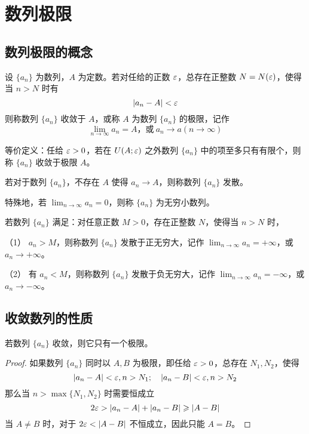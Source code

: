 \chapter{数列极限}

\section{数列极限的概念}

\begin{definition}
	设 $\{a_n\}$ 为数列，$A$ 为定数。若对任给的正数 $\varepsilon$，总存在正整数 $N=N(\varepsilon)$，使得当 $n>N$ 时有
	$$|a_n - A| < \varepsilon$$
	则称数列 $\{a_n\}$ 收敛于 $A$，或称 $A$ 为数列 $\{a_n\}$ 的极限，记作
	$$\displaystyle\lim_{n\to \infty} a_n = A \text{，或}\ a_n \to a(n \to \infty)$$
\end{definition}

等价定义：任给 $\varepsilon > 0$，若在 $U(A;\varepsilon)$ 之外数列 $\{a_n\}$ 中的项至多只有有限个，则称 $\{a_n\}$ 收敛于极限 $A$。

若对于数列 $\{a_n\}$，不存在 $A$ 使得 $a_n\to A$，则称数列 $\{a_n\}$ 发散。

特殊地，若 $\displaystyle\lim_{n\to \infty} a_n = 0$，则称 $\{a_n\}$ 为无穷小数列。

\begin{definition}[无穷大数列]
	若数列 $\{a_n\}$ 满足：对任意正数 $M>0$，存在正整数 $N$，使得当 $n>N$ 时，

	（1） $a_n>M$，则称数列 $\{a_n\}$ 发散于正无穷大，记作 $\displaystyle\lim_{n\to \infty} a_n = +\infty$，或 $a_n \to +\infty$。

	（2） 有 $a_n<M$，则称数列 $\{a_n\}$ 发散于负无穷大，记作 $\displaystyle\lim_{n\to \infty} a_n = -\infty$，或 $a_n \to -\infty$。
\end{definition}

\section{收敛数列的性质}

\begin{theorem}[唯一性]
	若数列 $\{a_n\}$ 收敛，则它只有一个极限。
\end{theorem}

\begin{proof}
	如果数列 $\{a_n\}$ 同时以 $A,B$ 为极限，即任给 $\varepsilon>0$，总存在 $N_1,N_2$，使得
	$$|a_n-A|<\varepsilon,n>N_1;\quad |a_n-B|<\varepsilon,n>N_2$$
	那么当 $n>\max\{N_1,N_2\}$ 时需要恒成立
	$$2\varepsilon > |a_n-A|+|a_n-B| \geqslant |A-B|$$
	当 $A\ne B$ 时，对于 $2\eps <|A-B|$ 不恒成立，因此只能 $A=B$。
\end{proof}

